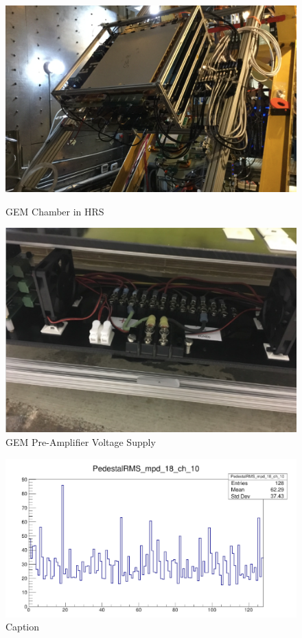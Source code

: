 \begin{figure}[!htbp]
  \centering
  \begin{minipage}[b]{0.45\textwidth}
    \includegraphics[width=\textwidth]{images/chap5/gem_in_hrs.png}
    \caption{GEM Chamber in HRS}
  \end{minipage}
  \hfill
  \begin{minipage}[b]{0.45\textwidth}
    \includegraphics[width=\textwidth]{images/chap5/gem_low_voltage.png}
    \caption{GEM Pre-Amplifier Voltage Supply}
  \end{minipage}
\end{figure}


\begin{figure}
    \centering
    \includegraphics[width=\textwidth]{images/chap5/gem_signal.png}
    \caption{Caption}
    \label{fig:apv_25_pedestal_plot}
\end{figure}

